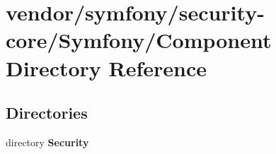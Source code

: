 \section{vendor/symfony/security-\/core/\+Symfony/\+Component Directory Reference}
\label{dir_192285592b9d9f0a2f1cbd09f74b8699}
\subsection*{Directories}
\begin{DoxyCompactItemize}
\item 
directory {\bf Security}
\end{DoxyCompactItemize}
